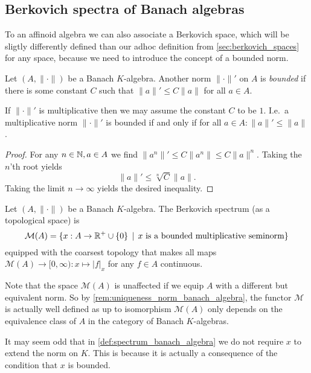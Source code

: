 \subsection{Berkovich spectra of Banach algebras} \label{sec:berkovich_spectra_of_banach_algebras}


To an affinoid algebra we can also associate a Berkovich space, which will be sligtly differently defined than our adhoc definition from \cref{sec:berkovich_spaces} for any space, because we need to introduce the concept of a bounded norm.

\begin{definition}
	Let $(A, \|\cdot \|)$ be a Banach $K$-algebra. Another norm $\|\cdot \|'$ on $A$ is \emph{bounded}  if there is some constant $C$ such that  $\|a\|' \le C \|a\|$ for all $a \in A$. 
\end{definition}


\begin{remark}
	If $\|\cdot \|'$ is multiplicative then we may assume the constant $C$ to be $1$. 
	I.e.\ a multiplicative norm $\|\cdot \|'$ is bounded if and only if  for all $a \in A: \|a\|' \le \|a\|$. 
\end{remark}
\begin{proof}
	For any $n \in \mathbb{N}, a \in A$ we find $\|a^{n}\|' \le C \|a^{n}\| \le C \|a\|^{n}$. 
	Taking the $n$'th root yields \[
		\|a\|' \le \sqrt[n]{C} \|a\|
	.\] 
	Taking the limit $n \to \infty$ yields the desired inequality. 
\end{proof}

\begin{definition}\label{def:spectrum_banach_algebra}
	Let $(A, \|\cdot \|)$ be a Banach $K$-algebra. 
	The Berkovich spectrum (as a topological space) is \[
		\mathcal{M} (A) = \{x: A \to\R^{+} \cup \{0\}  \st x \text{ is a bounded multiplicative seminorm}\} 
	\] 
	equipped with the coarsest topology that makes all maps $\mathcal{M} (A) \to [0, \infty): x \mapsto |f|_x$ for any $f \in A$ continuous. 
\end{definition}
Note that the space $\mathcal{M} (A)$ is unaffected if we equip $A$ with a different but equivalent norm. 
So by \cref{rem:uniqueness_norm_banach_algebra}, the functor $\mathcal{M}$ is actually well defined as up to isomorphism $\mathcal{M} (A)$ only depends on the equivalence class of $A$ in the category of Banach $K$-algebras.

It may seem odd that in \cref{def:spectrum_banach_algebra} we do not require $x$ to extend the norm on $K$. 
This is because it is actually a consequence of the condition that $x$ is bounded. 

